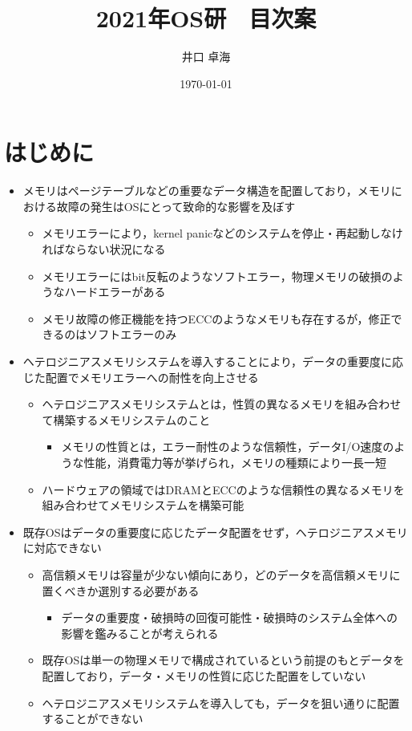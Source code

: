\documentclass[10.5ptj,a4j]{ltjsarticle}
\title{2021年OS研　目次案}
\author{井口 卓海}
\date{\today}
\providecommand{\tightlist}{%
  \setlength{\itemsep}{0pt}\setlength{\parskip}{0pt}}
\begin{document}
\maketitle
%
\tableofcontents

\newpage
\section{はじめに}
\begin{itemize}\tightlist{}
  \item メモリはページテーブルなどの重要なデータ構造を配置しており，メモリにおける故障の発生はOSにとって致命的な影響を及ぼす
  \begin{itemize}\tightlist{}
    \item メモリエラーにより，kernel panicなどのシステムを停止・再起動しなければならない状況になる
    \item メモリエラーにはbit反転のようなソフトエラー，物理メモリの破損のようなハードエラーがある
    \item メモリ故障の修正機能を持つECCのようなメモリも存在するが，修正できるのはソフトエラーのみ
  \end{itemize}

  \item ヘテロジニアスメモリシステムを導入することにより，データの重要度に応じた配置でメモリエラーへの耐性を向上させる
  \begin{itemize}\tightlist{}
    \item ヘテロジニアスメモリシステムとは，性質の異なるメモリを組み合わせて構築するメモリシステムのこと
    \begin{itemize}\tightlist{}
      \item メモリの性質とは，エラー耐性のような信頼性，データI/O速度のような性能，消費電力等が挙げられ，メモリの種類により一長一短
    \end{itemize}
    \item ハードウェアの領域ではDRAMとECCのような信頼性の異なるメモリを組み合わせてメモリシステムを構築可能
  \end{itemize}

  \item 既存OSはデータの重要度に応じたデータ配置をせず，ヘテロジニアスメモリに対応できない
  \begin{itemize}\tightlist{}
    \item 高信頼メモリは容量が少ない傾向にあり，どのデータを高信頼メモリに置くべきか選別する必要がある
    \begin{itemize}\tightlist{}
      \item データの重要度・破損時の回復可能性・破損時のシステム全体への影響を鑑みることが考えられる
    \end{itemize}
    \item 既存OSは単一の物理メモリで構成されているという前提のもとデータを配置しており，データ・メモリの性質に応じた配置をしていない
    \item ヘテロジニアスメモリシステムを導入しても，データを狙い通りに配置することができない
  \end{itemize}


\end{itemize}
\end{document}
